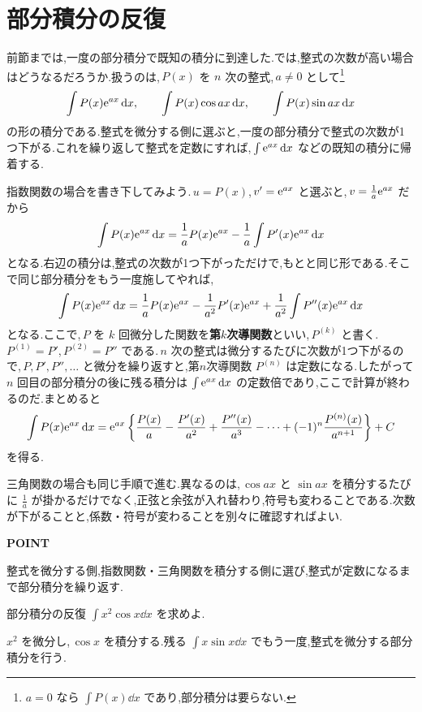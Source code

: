 \section{部分積分の反復}\label{節:部分積分の反復}

前節までは,一度の部分積分で既知の積分に到達した.では,整式の次数が高い場合はどうなるだろうか.扱うのは,\,$P(x)$ を $n$ 次の整式,\,$a\neq0$ として\footnote{$a=0$ なら $\int P(x)\dd x$ であり,部分積分は要らない.}
\[
 \int P(x)\mathrm{e}^{ax}\,\mathrm{d} x,\qquad
 \int P(x)\cos ax\,\mathrm{d} x,\qquad
 \int P(x)\sin ax\,\mathrm{d} x
\]
の形の積分である.整式を微分する側に選ぶと,一度の部分積分で整式の次数が1つ下がる.これを繰り返して整式を定数にすれば,\,$\int\mathrm{e}^{ax}\,\mathrm{d} x$ などの既知の積分に帰着する.

指数関数の場合を書き下してみよう.\,$u=P(x)$,\,$v'=\mathrm{e}^{ax}$ と選ぶと,\,$v=\frac1a\mathrm{e}^{ax}$ だから
\[
 \int P(x)\mathrm{e}^{ax}\,\mathrm{d} x
 =\frac1aP(x)\mathrm{e}^{ax}-\frac1a\int P'(x)\mathrm{e}^{ax}\,\mathrm{d} x
\]
となる.右辺の積分は,整式の次数が1つ下がっただけで,もとと同じ形である.そこで同じ部分積分をもう一度施してやれば,
\[
 \int P(x)\mathrm{e}^{ax}\,\mathrm{d} x
 =\frac1aP(x)\mathrm{e}^{ax}-\frac1{a^2}P'(x)\mathrm{e}^{ax}
  +\frac1{a^2}\int P''(x)\mathrm{e}^{ax}\,\mathrm{d} x
\]
となる.ここで,\,$P$ を $k$ 回微分した関数を\textbf{第$k$次導関数}といい,\,$P^{(k)}$ と書く.\,$P^{(1)}=P'$,\,$P^{(2)}=P''$ である.\,$n$ 次の整式は微分するたびに次数が1つ下がるので,\,$P,P',P'',\ldots$ と微分を繰り返すと,第$n$次導関数 $P^{(n)}$ は定数になる.したがって $n$ 回目の部分積分の後に残る積分は $\int\mathrm{e}^{ax}\,\mathrm{d} x$ の定数倍であり,ここで計算が終わるのだ.まとめると
\[
 \int P(x)\mathrm{e}^{ax}\,\mathrm{d} x
 =\mathrm{e}^{ax}\left\{\frac{P(x)}{a}-\frac{P'(x)}{a^2}+\frac{P''(x)}{a^3}-\cdots
  +(-1)^n\frac{P^{(n)}(x)}{a^{n+1}}\right\}+C
\]
を得る.

三角関数の場合も同じ手順で進む.異なるのは,\,$\cos ax$ と $\sin ax$ を積分するたびに $\frac1a$ が掛かるだけでなく,正弦と余弦が入れ替わり,符号も変わることである.次数が下がることと,係数・符号が変わることを別々に確認すればよい.

\begin{bookpoint}
\textbf{POINT}\par
整式を微分する側,指数関数・三角関数を積分する側に選び,整式が定数になるまで部分積分を繰り返す.
\end{bookpoint}

\begin{example}{部分積分の反復}
$\int x^2\cos x\dd x$ を求めよ.
\end{example}

$x^2$ を微分し,\,$\cos x$ を積分する.残る $\int x\sin x\dd x$ でもう一度,整式を微分する部分積分を行う.

